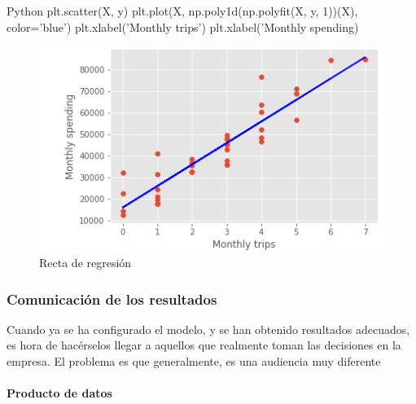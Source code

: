 \begin{TMcode}{Python}{}{}
  plt.scatter(X, y)
  plt.plot(X, np.poly1d(np.polyfit(X, y, 1))(X), color='blue')
  plt.xlabel('Monthly trips')
  plt.xlabel('Monthly spending)
\end{TMcode}
\vspace{0.25cm}

\begin{figure}[ht]
  \centering
  \includegraphics[scale=0.65]{img/bestFitLine.png}
  \caption{\label{fig:bestFitLine} Recta de regresión}
\end{figure}


\subsubsection{Comunicación de los resultados}
\label{subsec:state_dataScience_workflow_communication}

Cuando ya se ha configurado el modelo, y se han obtenido resultados adecuados,
es hora de hacérselos llegar a aquellos que realmente toman las decisiones en la
empresa. El problema es que generalmente, es una audiencia muy diferente

\paragraph{Producto de datos}
\mbox{}\\






